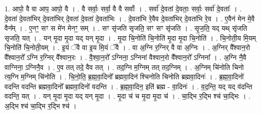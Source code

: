 \documentclass[17pt]{extarticle}
\begin{document}
1. आपो॒ वै वा आप॒ आपो॒ वै । . वै सर्वाः॒ सर्वा॒ वै वै सर्वाः᳚ । . सर्वा॑ दे॒वता॑ दे॒वताः॒ सर्वाः॒ सर्वा॑ दे॒वताः᳚ । . दे॒वता॑ दे॒वता॑भिर् दे॒वता॑भिर् दे॒वता॑ दे॒वता॑ दे॒वता॑भिः । . दे॒वता॑भि रे॒वैव दे॒वता॑भिर् दे॒वता॑भि रे॒व । . ए॒वैन॑ मेन मे॒वै वैन᳚म् । . ए॒नꣳ॒॒ सꣳ स मे॑न मेनꣳ॒॒ सम् । . सꣳ सृ॑जति सृजति॒ सꣳ सꣳ सृ॑जति । . सृ॒ज॒ति॒ यद् यथ् सृ॑जति सृजति॒ यत् । . यन् मृ॒दा मृ॒दा यद् यन् मृ॒दा । . मृ॒दा चि॒नोति॑ चि॒नोति॑ मृ॒दा मृ॒दा चि॒नोति॑ । . चि॒नोती॒य मि॒यम् चि॒नोति॑ चि॒नोती॒यम् । . इ॒यं ॅवै वा इ॒य मि॒यं ॅवै । . वा अ॒ग्नि र॒ग्निर् वै वा अ॒ग्निः । . अ॒ग्निर् वै᳚श्वान॒रो वै᳚श्वान॒रो᳚ ऽग्नि र॒ग्निर् वै᳚श्वान॒रः । . वै॒श्वा॒न॒रो᳚ ऽग्निना॒ ऽग्निना॑ वैश्वान॒रो वै᳚श्वान॒रो᳚ ऽग्निना᳚ । . अ॒ग्नि नै॒वै वाग्निना॒ ऽग्निनै॒व । . ए॒व तत् तदे॒ वैव तत् । . तद॒ग्नि म॒ग्निम् तत् तद॒ग्निम् । . अ॒ग्निम् चि॑नोति चिनो त्य॒ग्नि म॒ग्निम् चि॑नोति । . चि॒नो॒ति॒ ब्र॒ह्म॒वा॒दिनो᳚ ब्रह्मवा॒दिन॑ श्चिनोति चिनोति ब्रह्मवा॒दिनः॑ । . ब्र॒ह्म॒वा॒दिनो॑ वदन्ति वदन्ति ब्रह्मवा॒दिनो᳚ ब्रह्मवा॒दिनो॑ वदन्ति । . ब्र॒ह्म॒वा॒दिन॒ इति॑ ब्रह्म - वा॒दिनः॑ । . व॒द॒न्ति॒ यद् यद् व॑दन्ति वदन्ति॒ यत् । . यन् मृ॒दा मृ॒दा यद् यन् मृ॒दा । . मृ॒दा च॑ च मृ॒दा मृ॒दा च॑ । . चा॒द्भि र॒द्भि श्च॑ चा॒द्भिः । . अ॒द्भि श्च॑ चा॒द्भि र॒द्भि श्च॑ । \newline
\end{document}
